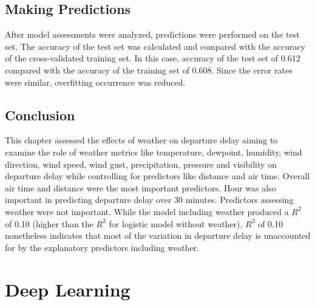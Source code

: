 \documentclass[12pt,twoside]{amherstthesis}
\begin{document}
  \clearpage
  
  \section{Making Predictions}\label{making-predictions-1}
  
  After model assessments were analyzed, predictions were performed on the
  test set. The accuracy of the test set was calculated and compared with
  the accuracy of the cross-validated training set. In this case, accuracy
  of the test set of 0.612 compared with the accuracy of the training set
  of 0.608. Since the error rates were similar, overfitting occurrence was
  reduced.
  
  \begin{Shaded}
  \begin{Highlighting}[]
  \StringTok{ }\NormalTok{(}  
  \end{Highlighting}
  \end{Shaded}
  
  \section{Conclusion}\label{conclusion-1}
  
  This chapter assessed the effects of weather on departure delay aiming
  to examine the role of weather metrics like temperature, dewpoint,
  humidity, wind direction, wind speed, wind gust, precipitation, pressure
  and visibility on departure delay while controlling for predictors like
  distance and air time. Overall air time and distance were the most
  important predictors. Hour was also important in predicting departure
  delay over 30 minutes. Predictors assessing weather were not important.
  While the model including weather produced a \(R^{2}\) of 0.10 (higher
  than the \(R^{2}\) for logistic model without weather), \(R^{2}\) of
  0.10 nonetheless indicates that most of the variation in departure delay
  is unaccounted for by the explanatory predictors including weather.
  
  \chapter{Deep Learning}\label{deep-learning}
  
\end{document}
